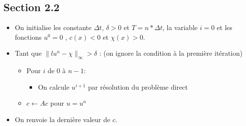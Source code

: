 \documentclass[a4paper]{article}
\begin{document}
	\subsection{Section 2.2}
	\begin{itemize}
		\item On initialise les constante $\Delta t$, $\delta>0$ et $T = n*\Delta t$, la variable $i=0$ et les fonctions $u^{0}=0$ , $c(x) < 0$ et $\chi(x)>0$.
		\item Tant que $\parallel lu^{n}-\chi \parallel_{\infty} > \delta$ : (on ignore la condition à la première itération)
		\begin{itemize}
			\item Pour $i$ de $0$ à $n-1$:
			\begin{itemize}
				\item On calcule $u^{i+1}$ par résolution du problème direct
			\end{itemize}
			\item $c \gets Ac$ pour $u=u^{n} $
		\end{itemize}
		\item On renvoie la dernière valeur de $c$.
	\end{itemize}
\end{document}
